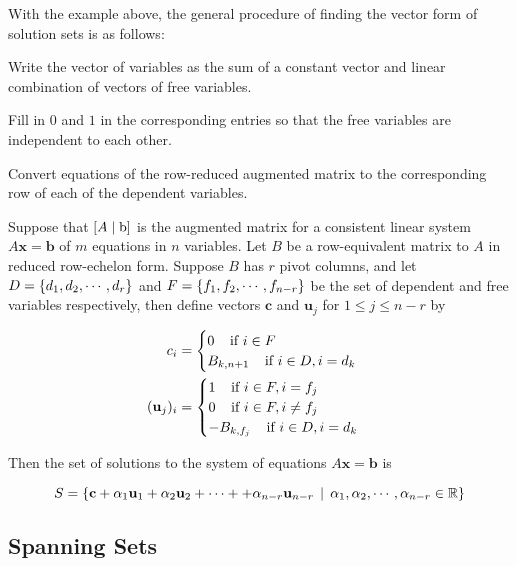 \documentclass[a4paper,12pt]{article}
\begin{document}
With the example above, the general procedure of finding the vector form of solution sets is as follows:

\begin{nlist}
  \item Write the vector of variables as the sum of a constant vector and linear combination of vectors of free variables.
  \item Fill in $0$ and $1$ in the corresponding entries so that the free variables are independent to each other.
  \item Convert equations of the row-reduced augmented matrix to the corresponding row of each of the dependent variables.
\end{nlist}

\begin{thm}
  Suppose that $\left[ A\mid\mathrm{b}\right]$ is the augmented matrix for a consistent linear system $A\mathbf{x}=\mathbf{b}$ of $m$ equations in $n$ variables. Let $B$ be a row-equivalent matrix to $A$ in reduced row-echelon form. Suppose $B$ has $r$ pivot columns, and let $D=\left\{ d_{1},d_{2},\cdots,d_{r}\right\}$ and $F=\left\{ f_{1},f_{2},\cdots,f_{n-r}\right\}$ be the set of dependent and free variables respectively, then define vectors $\mathbf{c}$ and $\mathbf{u}_{j}$ for $1\leq j\leq n-r$ by

  $$\begin{aligned}[t]
    c_{i}&=\begin{cases}
      0\;\;\;\;\text{if }i\in F\\
      B_{k,n+1}\;\;\;\;\text{if }i\in D, i=d_{k}
    \end{cases}\\
    (\mathbf{u}_{j})_{i}&=\begin{cases}
      1\;\;\;\;\text{if }i\in F, i=f_{j}\\
      0\;\;\;\;\text{if }i\in F, i\neq f_{j}\\
      -B_{k,f_{j}}\;\;\;\;\text{if }i\in D, i=d_{k}
    \end{cases}
  \end{aligned}$$\s

  Then the set of solutions to the system of equations $A\mathbf{x}=\mathbf{b}$ is

  $$S=\left\{ \mathbf{c}+\alpha_{1}\mathbf{u}_{1}+\alpha_{2}\mathbf{u}_{2}+\cdots++\alpha_{n-r}\mathbf{u}_{n-r}\,\mid\,\alpha_{1},\alpha_{2},\cdots,\alpha_{n-r}\in\mathbb{R}\right\}$$
\end{thm}

\subsection{Spanning Sets}
\end{document}

